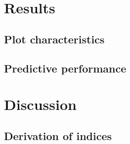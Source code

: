 \documentclass[review]{elsarticle}
\begin{document}
\section{Results}

\subsection{Plot characteristics}





\subsection{Predictive performance}

\section{Discussion}

\subsection{Derivation of indices}
\end{document}
